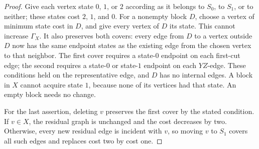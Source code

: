 \begin{proof}
Give each vertex state $0$, $1$, or $2$ according as it belongs to
$S_0$, to $S_1$, or to neither; these states cost $2$, $1$, and $0$.
For a nonempty block $D$, choose a vertex of minimum state cost in
$D$, and give every vertex of $D$ its state. This cannot increase
$\Gamma_X$. It also preserves both covers: every edge from $D$
to a vertex outside $D$ now has the same endpoint states as the
existing edge from the chosen vertex to that neighbor. The first
cover requires a state-$0$ endpoint on each first-cut edge; the second
requires a state-$0$ or state-$1$ endpoint on each $YZ$-edge.
These conditions held on the representative edge, and $D$ has no
internal edges. A block in $X$ cannot acquire state $1$, because
none of its vertices had that state. An empty block needs no change.

For the last assertion, deleting $v$ preserves the first cover by
the stated condition. If $v\in X$, the residual graph is unchanged
and the cost decreases by two. Otherwise, every new residual edge
is incident with $v$, so moving $v$ to $S_1$ covers all such edges
and replaces cost two by cost one.
\end{proof}
